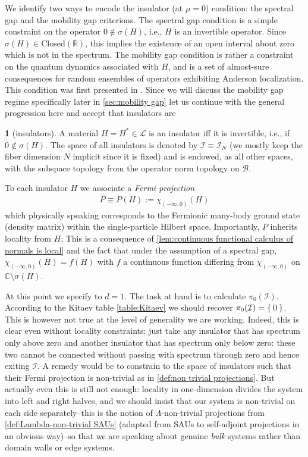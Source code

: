 \documentclass[a4paper,10pt]{article}
\numberwithin{equation}{section}
\theoremstyle{plain}
\theoremstyle{plain}
\theoremstyle{plain}
\theoremstyle{plain}
\theoremstyle{plain}
\theoremstyle{remark}
\theoremstyle{definition}
\newtheorem{defn}[thm]{\protect\definitionname}
\theoremstyle{plain}
\providecommand{\definitionname}{Definition}
\newcommand{\RR}{\mathbb{R}}
\newcommand{\CC}{\mathbb{C}}
\newcommand{\calB}{\mathcal{B}}
\newcommand{\calL}{\mathcal{L}}
\newcommand{\calI}{\mathcal{I}}
\newcommand{\Closed}[1]{\mathrm{Closed}(#1)}
\newcommand{\eq}[1]{\begin{align*}#1\end{align*}}
\begin{document}
	We identify two ways to encode the insulator (at $\mu=0$) condition: the spectral gap and the mobility gap criterions. The spectral gap condition is a simple constraint on the operator ${0\notin\sigma(H)}$, i.e., $H$ is an invertible operator. Since $\sigma(H)\in\Closed{\RR}$, this implies the existence of an open interval about zero which is not in the spectrum. The mobility gap condition is rather a constraint on the quantum dynamics associated with $H$, and is a set of almost-sure consequences for random ensembles of operators exhibiting Anderson localization. This condition was first presented in \cite{EGS_2005}. Since we will discuss the mobility gap regime specifically later in \cref{sec:mobility gap} let us continue with the general progression here and accept that insulators are
	\begin{defn}[insulators] A material $H=H^\ast\in\calL$ is an insulator iff it is invertible, i.e., if $0\notin\sigma(H)$. The space of all insulators is denoted by $\calI\equiv\calI_N$ (we mostly keep the fiber dimension $N$ implicit since it is fixed) and is endowed, as all other spaces, with the subspace topology from the operator norm topology on $\calB$.
	\end{defn}
	
	
	To each insulator $H$ we associate a \emph{Fermi projection} \eq{P\equiv P(H)  := \chi_{(-\infty,0)}(H)} which physically speaking corresponds to the Fermionic many-body ground state (density matrix) within the single-particle Hilbert space. Importantly, $P$ inherits locality from $H$: This is a consequence of \cref{lem:continuous functional calculus of normals is local} and the fact that under the assumption of a spectral gap, $\chi_{(-\infty,0)}(H)=f(H)$ with $f$ a continuous function differing from $\chi_{(-\infty,0)}$ on $\CC\setminus\sigma(H)$.
	
	
	
	At this point we specify to $d=1$. The task at hand is to calculate $\pi_0(\calI)$. According to the Kitaev table \cref{table:Kitaev} we should recover $\pi_0(\calI)=\Set{0}$. This is however not true at the level of generality we are working. Indeed, this is clear even without locality constraints: just take any insulator that has spectrum only above zero and another insulator that has spectrum only below zero: these two cannot be connected without passing with spectrum through zero and hence exiting $\calI$. A remedy would be to constrain to the space of insulators such that their Fermi projection is non-trivial as in \cref{def:non trivial projections}. But actually even this is still not enough: locality in one-dimension divides the system into left and right halves, and we should insist that our system is non-trivial on each side separately--this is the notion of $\Lambda$-non-trivial projections from \cref{def:Lambda-non-trivial SAUs} (adapted from SAUs to self-adjoint projections in an obvious way)--so that we are speaking about genuine \emph{bulk} systems rather than domain walls or edge systems. 
	
\end{document}
